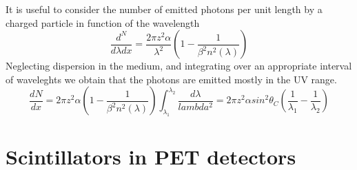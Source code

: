 It is useful to consider the number of emitted photons per unit length by a charged particle in function of the wavelength
\begin{equation}
\frac{d^N}{d\lambda dx} = \frac{2\pi z^{2}\alpha}{\lambda ^{2}}\left( 1 - \frac{1}{\beta ^{2}n^{2}(\lambda)} \right)
\end{equation}
Neglecting dispersion in the medium, and integrating over an appropriate interval of waveleghts we obtain that the photons are emitted mostly in the UV range.
\begin{equation}
\frac{dN}{dx} = 2\pi z^{2} \alpha \left( 1-\frac{1}{\beta ^{2} n^{2} (\lambda)}\right) \int _{\lambda _{1}} ^{\lambda _{2}} \frac{d\lambda}{lambda ^{2}}  = 2\pi z^{2}\alpha sin^{2}\theta _{C} \left( \frac{1}{\lambda _{1}}-\frac{1}{\lambda _{2}}\right)
\end{equation}
\section{Scintillators in PET detectors}



